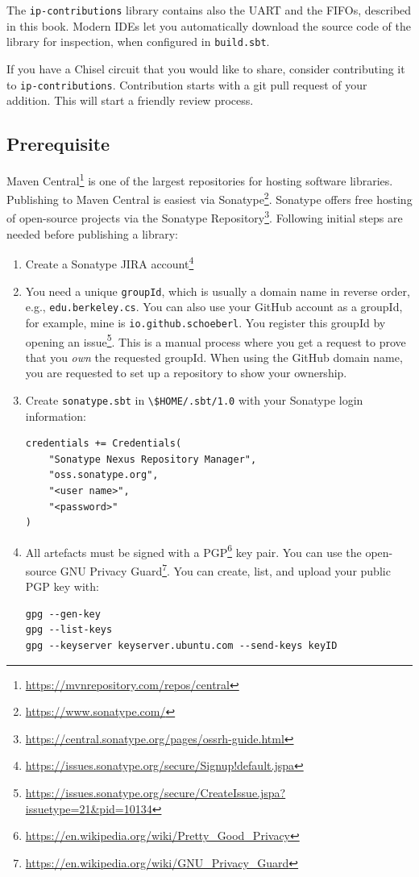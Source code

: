 \documentclass[%
    10pt,
    headinclude, footexclude,
    openright, %
    notitlepage,
    cleardoubleempty,
    headsepline,
    pointlessnumbers,
    bibtotoc, idxtotoc,
    ]{scrbook}
\newcommand{\code}[1]{{\lstinline[basicstyle=\small\ttfamily]{#1}}}
\newcommand{\myref}[2]{\href{#1}{#2}}
\renewcommand{\myref}[2]{{#2}{\footnote{\url{#1}}}}
\begin{document}
\noindent The \code{ip-contributions} library contains also the UART and the FIFOs, described in this book.
Modern IDEs let you automatically download the source code of the library for inspection, when configured
in \code{build.sbt}.

If you have a Chisel circuit that you would like to share, consider contributing it to \code{ip-contributions}.
Contribution starts with a git pull request of your addition. This will start a friendly review process.

\subsection{Prerequisite}

\myref{https://mvnrepository.com/repos/central}{Maven Central} is one of the largest repositories for
hosting software libraries. Publishing to Maven Central is easiest via
\myref{https://www.sonatype.com/}{Sonatype}. Sonatype offers free hosting of open-source
projects via the \myref{https://central.sonatype.org/pages/ossrh-guide.html}{Sonatype Repository}.
Following initial steps are needed before publishing a library:

\begin{enumerate}
\item Create a \myref{https://issues.sonatype.org/secure/Signup!default.jspa}{Sonatype JIRA account}
\item You need a unique \code{groupId}, which is usually a domain name in reverse order, e.g., \code{edu.berkeley.cs}.
You can also use your GitHub account as a groupId, for example, mine is \code{io.github.schoeberl}. You register this groupId
by opening an \myref{https://issues.sonatype.org/secure/CreateIssue.jspa?issuetype=21&pid=10134}{issue}.
This is a manual process where you get a request to prove that you \emph{own} the requested groupId.
When using the GitHub domain name, you are requested to set up a repository to show your ownership.
\item Create \code{sonatype.sbt} in \code{\$HOME/.sbt/1.0} with your Sonatype login information:
\begin{verbatim}
credentials += Credentials(
    "Sonatype Nexus Repository Manager",
    "oss.sonatype.org",
    "<user name>",
    "<password>"
)
\end{verbatim}
\item All artefacts must be signed with a \myref{https://en.wikipedia.org/wiki/Pretty_Good_Privacy}{PGP} key pair.
You can use the open-source \myref{https://en.wikipedia.org/wiki/GNU_Privacy_Guard}{GNU Privacy Guard}.
You can create, list, and upload your public PGP key with:
\begin{verbatim}
gpg --gen-key
gpg --list-keys
gpg --keyserver keyserver.ubuntu.com --send-keys keyID
\end{verbatim}
\end{enumerate}
\end{document}
